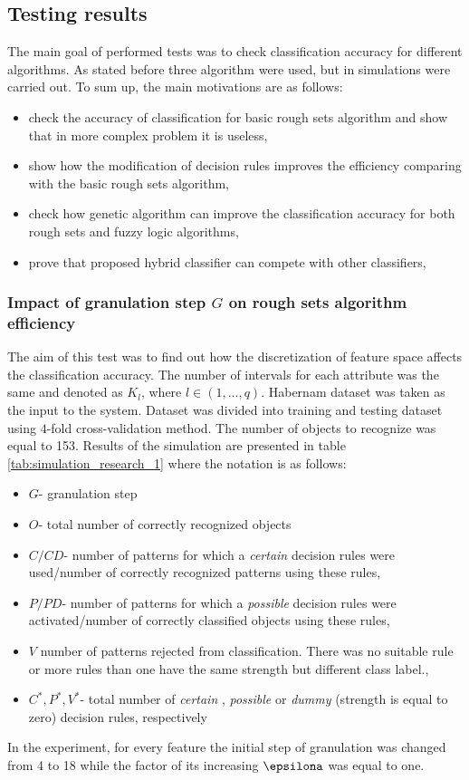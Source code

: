 \subsection{Testing results}
\label{cha:Simulation_results}
The main goal of performed tests was to check classification accuracy for
different algorithms. As stated before three algorithm were used, but in
simulations were carried out. To sum up, the main motivations are as follows:
\begin{itemize}
    \item check the accuracy of classification for basic rough sets algorithm
        and show that in more complex problem it is useless,
    \item show how the modification of decision rules improves the efficiency
        comparing with the basic rough sets algorithm,
    \item check how genetic algorithm can improve the classification accuracy
        for both rough sets and fuzzy logic algorithms,
    \item prove that proposed hybrid classifier can compete with other
        classifiers,
\end{itemize}
\subsubsection{Impact of granulation step $G$ on rough sets algorithm efficiency}
\label{cha:Simulation_reaearch_1}
The aim of this test was to find out how the discretization of feature space
affects the classification accuracy. The number of intervals for each
attribute was the same and denoted as $K_l$, where $l \in (1, \ldots, q)$.
Habernam dataset was taken as the input to the system. Dataset was divided into
training and testing dataset using $4$-fold cross-validation method. The number
of objects to recognize was equal to 153.
Results of the simulation are presented in table
\ref{tab:simulation_research_1} where the notation is as follows:
\begin{itemize}
    \item $G$- granulation step
    \item $O$- total number of correctly recognized objects
    \item $C/CD$- number of patterns for which a \textit{certain} decision rules were
        used/number of correctly recognized patterns using these rules,
    \item $P/PD$- number of patterns for which a \textit{possible} decision rules were
        activated/number of correctly classified objects using these rules,
    \item $V$ number of patterns rejected from classification. There was no
        suitable rule or more rules than one have the same strength but different class
        label.,
    \item $C^*, P^*, V^*$- total number of \textit{certain} , \textit{possible}
        or \textit{dummy} (strength is equal to zero) decision rules, respectively
\end{itemize}
In the experiment, for every feature the initial step of granulation was
changed from 4 to 18 while the factor of its increasing $\epsilona$  was equal 
to one.


